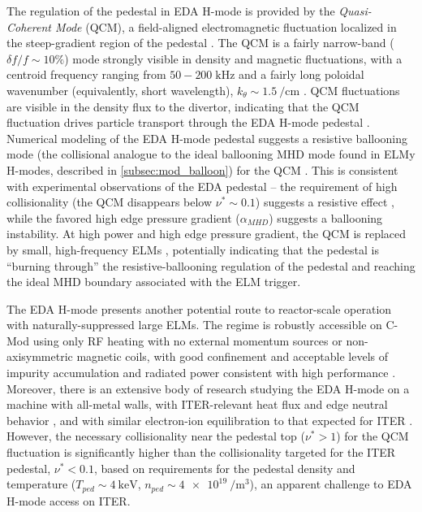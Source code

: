 The regulation of the pedestal in EDA H-mode is provided by the \emph{Quasi-Coherent Mode} (QCM), a field-aligned electromagnetic fluctuation localized in the steep-gradient region of the pedestal \cite{Hubbard2001,Terry2005,Mossessian2003}.  The QCM is a fairly narrow-band ($\delta f/f \sim 10\%$) mode strongly visible in density and magnetic fluctuations, with a centroid frequency ranging from $50-200\;\si{\kilo\hertz}$ and a fairly long poloidal wavenumber (equivalently, short wavelength), $k_\theta \sim \SI{1.5}{\per\centi\meter}$ \cite{Terry2005}.  QCM fluctuations are visible in the density flux to the divertor, indicating that the QCM fluctuation drives particle transport through the EDA H-mode pedestal \cite{Greenwald2007,Terry2005}.  Numerical modeling of the EDA H-mode pedestal suggests a resistive ballooning mode (the collisional analogue to the ideal ballooning MHD mode found in ELMy H-modes, described in \cref{subsec:mod_balloon}) for the QCM \cite{Mazurenko2002,Hughes2007a}.  This is consistent with experimental observations of the EDA pedestal -- the requirement of high collisionality (the QCM disappears below $\nu^* \sim 0.1$) suggests a resistive effect \cite{Hughes2013}, while the favored high edge pressure gradient ($\alpha_{MHD}$) suggests a ballooning instability.  At high power and high edge pressure gradient, the QCM is replaced by small, high-frequency ELMs \cite{Mossessian2002,Mossessian2003,Hughes2007a}, potentially indicating that the pedestal is ``burning through'' the resistive-ballooning regulation of the pedestal and reaching the ideal MHD boundary associated with the ELM trigger.

The EDA H-mode presents another potential route to reactor-scale operation with naturally-suppressed large ELMs.  The regime is robustly accessible on C-Mod using only RF heating with no external momentum sources or non-axisymmetric magnetic coils, with good confinement and acceptable levels of impurity accumulation and radiated power consistent with high performance \cite{Hughes2011}.  Moreover, there is an extensive body of research studying the EDA H-mode on a machine with all-metal walls, with ITER-relevant heat flux and edge neutral behavior \cite{Hubbard2007,Greenwald2007}, and with similar electron-ion equilibration to that expected for ITER \cite{McDermott2009a}.  However, the necessary collisionality near the pedestal top ($\nu^* > 1$) for the QCM fluctuation is significantly higher than the collisionality targeted for the ITER pedestal, $\nu^* < 0.1$, based on requirements for the pedestal density and temperature ($T_{ped} \sim \SI{4}{\kilo\electronvolt}$, $n_{ped} \sim \SI{4e19}{\per\meter\cubed}$), an apparent challenge to EDA H-mode access on ITER.\nicesectionending

